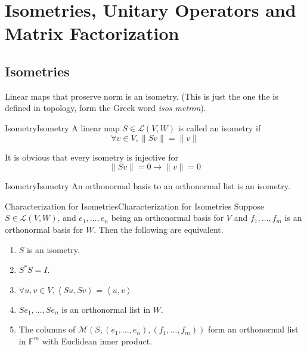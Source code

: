 \documentclass[../main.tex]{subfiles}
\begin{document}
\section{Isometries, Unitary Operators and Matrix Factorization}
\subsection{Isometries}

Linear maps that proserve norm is an isometry. (This is just the one the is defined in topology, form the Greek word \emph{isos metron}).
\begin{definition}{Isometry}{Isometry}
A linear map $S\in \mathscr{L}(V,W)$ is called an isometry if
\begin{equation*}
\forall v\in V,\|Sv\| = \|v\|
\end{equation*}
\end{definition}

It is obvious that every isometry is injective for
\begin{equation*}
\|Sv\|=0 \rightarrow \|v\|=0
\end{equation*}

\begin{example}{Isometry}{Isometry}
An orthonormal basis to an orthonormal list is an isometry.
\end{example}

\begin{theorem}{Characterization for Isometries}{Characterization for Isometries}
Suppose $S\in \mathscr{L}(V,W)$, and $e_1, \ldots ,e_n$ being an orthonormal basis for $V$ and $f_1, \ldots ,f_m$ is an orthonormal basis for $W$. Then the following are equivalent.
\begin{enumerate}
	\item $S$ is an isometry.
	\item $S^*S=I$.
	\item $\forall u,v\in V, \left<Su,Sv\right> = \left<u,v\right>$
	\item $Se_1, \ldots ,Se_n$ is an orthonormal list in $W$.
	\item The columns of  $\mathscr{M}(S,(e_1, \ldots ,e_n),(f_1, \ldots ,f_m))$ form an orthonormal list in $\mathbb{F}^m$ with Euclidean inner product.
\end{enumerate}
\end{theorem}
\end{document}
